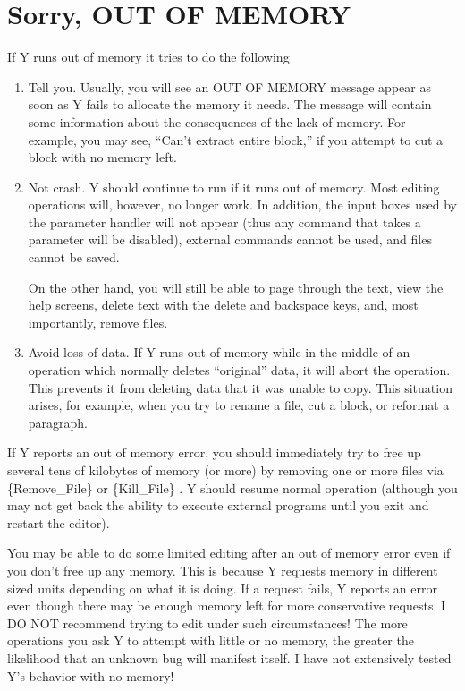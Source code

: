 \section{Sorry, OUT OF MEMORY}

If Y runs out of memory it tries to do the following

\begin{enumerate}

\item Tell you. Usually, you will see an OUT OF MEMORY message appear as soon as Y fails to
  allocate the memory it needs. The message will contain some information about the consequences
  of the lack of memory. For example, you may see, ``Can't extract entire block,'' if you attempt
  to cut a block with no memory left.

\item Not crash. Y should continue to run if it runs out of memory. Most editing operations
  will, however, no longer work. In addition, the input boxes used by the parameter handler will
  not appear (thus any command that takes a parameter will be disabled), external commands
  cannot be used, and files cannot be saved.

  On the other hand, you will still be able to page through the text, view the help screens,
  delete text with the delete and backspace keys, and, most importantly, remove files.

\item Avoid loss of data. If Y runs out of memory while in the middle of an operation which
  normally deletes ``original'' data, it will abort the operation. This prevents it from
  deleting data that it was unable to copy. This situation arises, for example, when you try to
  rename a file, cut a block, or reformat a paragraph.

\end{enumerate}

If Y reports an out of memory error, you should immediately try to free up several tens of
kilobytes of memory (or more) by removing one or more files via \{Remove\_File\}  or
\{Kill\_File\} . Y should resume normal operation (although you may not get back
the ability to execute external programs until you exit and restart the editor).

You may be able to do some limited editing after an out of memory error even if you don't free
up any memory. This is because Y requests memory in different sized units depending on what it
is doing. If a request fails, Y reports an error even though there may be enough memory left for
more conservative requests. I DO NOT recommend trying to edit under such circumstances! The more
operations you ask Y to attempt with little or no memory, the greater the likelihood that an
unknown bug will manifest itself. I have not extensively tested Y's behavior with no memory!

